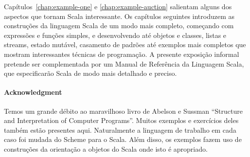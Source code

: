 \documentclass[a4paper,12pt,twoside,titlepage]{book}
\begin{document}

Capítulos~\ref{chap:example-one} e \ref{chap:example-auction}
salientam alguns dos aspectos que tornam Scala interessante. Os
capítulos seguintes introduzem as construções da linguagem Scala de um
modo mais completo, começando com expressões e funções simples, e 
desenvolvendo até objetos e classes, listas e streams, estado 
mutável, casamento de padrões até exemplos mais completos que mostram
interessantes técnicas de programação. A presente exposição informal
pretende ser complementada por um Manual de Referência da Linguagem Scala, que
especificarão Scala de modo mais detalhado e preciso. 

\paragraph{Acknowledgment}

Temos um grande débito ao maravilhoso livro de Abelson e Sussman
``Structure and Interpretation of Computer
Programs''\cite{abelson-sussman:structure}. Muitos exemplos e exercícios 
deles também estão presentes aqui. Naturalmente a linguagem de trabalho em
cada caso foi mudada do Scheme para o Scala. Além disso, os exemplos
fazem uso de construções da orientação a objetos do Scala onde isto é
apropriado. 




\end{document}
